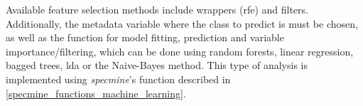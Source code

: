 Available feature selection methods include wrappers (\gls{rfe}) and filters. Additionally, the metadata variable where the class to predict is must be chosen, as well as the function for model fitting, prediction and variable importance/filtering, which can be done using random forests, linear regression, bagged trees, \gls{lda} or the Naive-Bayes method. This type of analysis is implemented using \textit{specmine}'s function described in \autoref{specmine_functions_machine_learning}.









